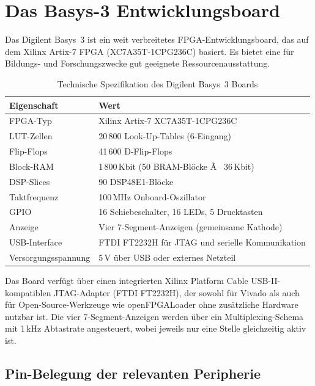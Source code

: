 ﻿\documentclass[12pt,a4paper]{report}
\begin{document}
\section{Das Basys-3 Entwicklungsboard}
\label{sec:basys3_board}

Das Digilent Basys~3 ist ein weit verbreitetes FPGA-Entwicklungsboard, das auf dem Xilinx Artix-7 FPGA (XC7A35T-1CPG236C) basiert. Es bietet eine für Bildungs- und Forschungszwecke gut geeignete Ressourcenausstattung.

\begin{table}[H]
\centering
\begin{tabular}{|l|l|}
\hline
\textbf{Eigenschaft} & \textbf{Wert} \\
\hline
FPGA-Typ & Xilinx Artix-7 XC7A35T-1CPG236C \\
LUT-Zellen & 20\,800 Look-Up-Tables (6-Eingang) \\
Flip-Flops & 41\,600 D-Flip-Flops \\
Block-RAM & 1\,800\,Kbit (50 BRAM-Blöcke Ã  36\,Kbit) \\
DSP-Slices & 90 DSP48E1-Blöcke \\
Taktfrequenz & 100\,MHz Onboard-Oszillator \\
GPIO & 16 Schiebeschalter, 16 LEDs, 5 Drucktasten \\
Anzeige & Vier 7-Segment-Anzeigen (gemeinsame Kathode) \\
USB-Interface & FTDI FT2232H für JTAG und serielle Kommunikation \\
Versorgungsspannung & 5\,V über USB oder externes Netzteil \\
\hline
\end{tabular}
\caption{Technische Spezifikation des Digilent Basys~3 Boards}
\label{tab:basys3_specs}
\end{table}

Das Board verfügt über einen integrierten Xilinx Platform Cable USB-II-kompatiblen JTAG-Adapter (FTDI FT2232H), der sowohl für Vivado als auch für Open-Source-Werkzeuge wie openFPGALoader ohne zusätzliche Hardware nutzbar ist. Die vier 7-Segment-Anzeigen werden über ein Multiplexing-Schema mit 1\,kHz Abtastrate angesteuert, wobei jeweils nur eine Stelle gleichzeitig aktiv ist.

\subsection{Pin-Belegung der relevanten Peripherie}
\label{subsec:pin_belegung}
\end{document}
